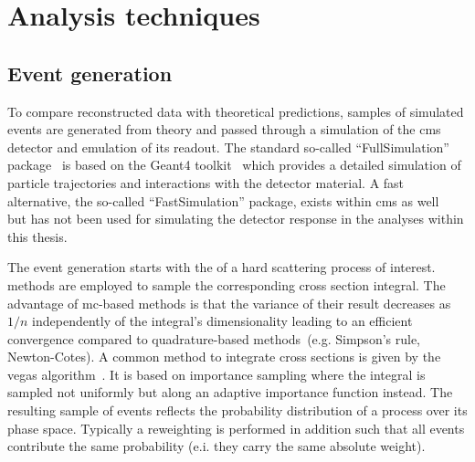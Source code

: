 \chapter{Analysis techniques}


\section{Event generation}
\label{sec:technique-event-gen}

To compare reconstructed data with theoretical predictions, samples of simulated events are generated from theory and passed through a simulation of the \gls{cms} detector and emulation of its readout. The standard so-called ``FullSimulation'' package~\cite{1742-6596-396-2-022003,1742-6596-664-7-072022} is based on the Geant4 toolkit~\cite{Agostinelli2003250} which provides a detailed simulation of particle trajectories and interactions with the detector material. A fast alternative, the so-called ``FastSimulation'' package, exists within \gls{cms} as well~\cite{fsimRahmat} but has not been used for simulating the detector response in the analyses within this thesis.

The event generation starts with the  of a hard scattering process of interest.  methods are employed to sample the corresponding cross section integral. The advantage of \gls{mc}-based methods is that the variance of their result decreases as $1/n$ independently of the integral's dimensionality leading to an efficient convergence compared to quadrature-based methods~(e.g. Simpson's rule, Newton-Cotes). A common method to integrate cross sections is given by the \gls{vegas} algorithm~\cite{OHL199913}. It is based on importance sampling where the integral is sampled not uniformly but along an adaptive importance function instead. The resulting sample of events reflects the probability distribution of a process over its phase space. Typically a reweighting is performed in addition such that all events contribute the same probability (e.i. they carry the same absolute weight). 

